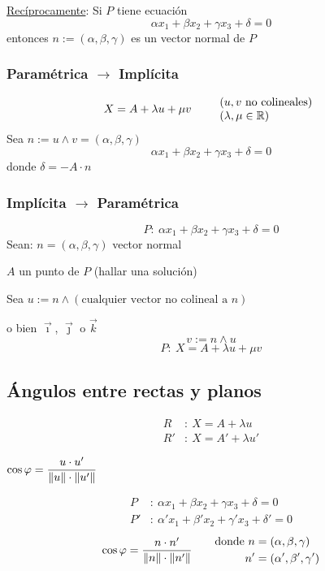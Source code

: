\documentclass[11pt,a4paper]{article}
\begin{document}
\underline{Recíprocamente}: Si $P$ tiene ecuación
\[
\alpha x_1+\beta x_2+\gamma x_3+\delta=0
\]
entonces $n:=(\alpha,\beta,\gamma)$ es un vector normal de $P$

\subsubsection*{Paramétrica \texorpdfstring{$\to$}{->} Implícita}

\[
X=A+\lambda u+\mu v
\qquad
\begin{array}{l}
(u,v\text{ no colineales})\\
(\lambda,\mu\in\mathbb{R})
\end{array}
\]
Sea $n:=u\wedge v=(\alpha,\beta,\gamma)$
\[
\alpha x_1+\beta x_2+\gamma x_3+\delta=0
\]
donde $\delta=-A\cdot n$

\subsubsection*{Implícita \texorpdfstring{$\to$}{->} Paramétrica}

\[
P:\ \alpha x_1+\beta x_2+\gamma x_3+\delta=0
\]
Sean: \quad $n=(\alpha,\beta,\gamma)$ vector normal

$A$ un punto de $P$ (hallar una solución)

Sea $u:=n\wedge(\text{cualquier vector no colineal a } n)$

\qquad o bien $\vec\imath$, $\vec\jmath$ o $\vec k$
\[
v:=n\wedge u
\]
\[
P:\ X=A+\lambda u+\mu v
\]

\subsection{Ángulos entre rectas y planos}

\[
\begin{aligned}
R&:\ X=A+\lambda u\\
R'&:\ X=A'+\lambda u'
\end{aligned}
\]
\begin{center}
$\displaystyle\cos\varphi=\frac{u\cdot u'}{\lVert u\rVert\cdot\lVert u'\rVert}$
\end{center}

\[
\begin{aligned}
P&:\ \alpha x_1+\beta x_2+\gamma x_3+\delta=0\\
P'&:\ \alpha'x_1+\beta'x_2+\gamma'x_3+\delta'=0
\end{aligned}
\]
\[
\cos\varphi=\frac{n\cdot n'}{\lVert n\rVert\cdot\lVert n'\rVert}
\qquad
\begin{aligned}
\text{donde }n&=(\alpha,\beta,\gamma)\\
n'&=(\alpha',\beta',\gamma')
\end{aligned}
\]
\end{document}
